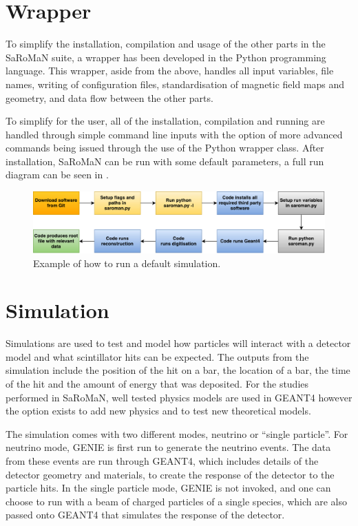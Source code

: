 \section{Wrapper}
To simplify the installation, compilation and usage of the other parts in the SaRoMaN suite, a wrapper has been developed in the Python programming language. This wrapper, aside from the above, handles all input variables, file names, writing of configuration files, standardisation of magnetic field maps and geometry, and data flow between the other parts. 

To simplify for the user, all of the installation, compilation and running are handled through simple command line inputs with the option of more advanced commands being issued through the use of the Python wrapper class. After installation, SaRoMaN can be run with some default parameters, a full run diagram can be seen in .

\begin{figure}[h!]
\centering
\includegraphics[width=\textwidth]{figures/block.pdf}
\caption{Example of how to run a default simulation.}
\label{fig:block}
\end{figure}

\pagebreak
\section{Simulation}
Simulations are used to test and model how particles will interact with a detector model and what scintillator hits can be expected. The outputs from the simulation include the position of the hit on a bar, the location of a bar, the time of the hit and the amount of energy that was deposited. For the studies performed in SaRoMaN, well tested physics models are used in GEANT4 however the option exists to add new physics and to test new theoretical models.

The simulation comes with two different modes, neutrino or ``single particle''. For neutrino mode, GENIE is first run to generate the neutrino events. The data from these events are run through GEANT4, which includes details of the detector geometry and materials, to create the response of the detector to the particle hits. In the single particle mode, GENIE is not invoked, and one can choose to run with a beam of charged particles of a single species, which are also passed onto GEANT4 that simulates the response of the detector.

